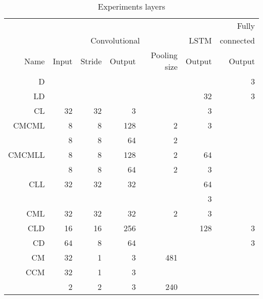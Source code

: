 \begin{table}[!ht]
    \centering
    \caption{Experiments layers}
    \label{tab:carvinglayers}
\begin{tabular}{r|r|r|r|r|r|r}

       & \multicolumn{4}{|c|}{}                         &        & Fully           \\     
       & \multicolumn{4}{|c|}{Convolutional}            & LSTM   &       connected \\ \hline
Name   & Input         & Stride & Output & Pooling size & Output & Output          \\ \hline\hline

D      &               &        &        &              &        & 3               \\ \hline
LD     &               &        &        &              & 32     & 3               \\ \hline
CL     & 32            & 32     & 3      &              & 3      &                 \\ \hline
CMCML  & 8             & 8      & 128    & 2            & 3      &                 \\       
       & 8             & 8      & 64     & 2            &        &                 \\ \hline
CMCMLL & 8             & 8      & 128    & 2            & 64     &                 \\       
       & 8             & 8      & 64     & 2            & 3      &                 \\ \hline
CLL    & 32            & 32     & 32     &              & 64     &                 \\       
       &               &        &        &              & 3      &                 \\ \hline
CML    & 32            & 32     & 32     & 2            & 3      &                 \\ \hline
CLD    & 16            & 16     & 256    &              & 128    & 3               \\ \hline
CD     & 64            & 8      & 64     &              &        & 3               \\ \hline
CM     & 32            & 1      & 3      & 481          &        &                 \\ \hline
CCM    & 32            & 1      & 3      &              &        &                 \\       
       & 2             & 2      & 3      & 240          &        &                 \\ \hline
\end{tabular}
\end{table}